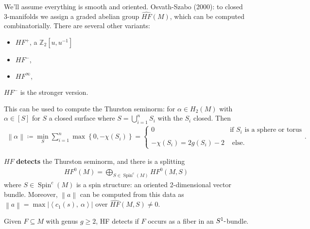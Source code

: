 We'll assume everything is smooth and oriented. Osvath-Szabo (2000): to
closed 3-manifolds we assign a graded abelian group \(\widehat{HF}(M)\),
which can be computed combinatorially. There are several other variants:

\begin{itemize}
\tightlist
\item
  \(HF^+\), a \({\mathbb{Z}}_2[u, u ^{-1} ]\)
\item
  \(HF^-\),
\item
  \(HF^\infty\),
\end{itemize}

\(HF^-\) is the stronger version.

This can be used to compute the Thurston seminorm: for
\(\alpha\in H_2(M)\) with \(\alpha\in [S]\) for \(S\) a closed surface
where \(S = \bigcup_{i=1}^n S_i\) with the \(S_i\) closed. Then
\begin{align*}
{\left\lVert { \alpha } \right\rVert} \coloneqq\min_S \sum_{i=1}^n \max\left\{{0, - \chi(S_i) }\right\} 
=
\begin{cases}
0 & \text{if } S_i \text{ is a sphere or torus} \\ 
\\
- \chi(S_i) = 2g(S_i) - 2  & \text{ else} .
\end{cases}
.\end{align*}

\begin{theorem}

\(HF\) \textbf{detects} the Thurston seminorm, and there is a splitting
\begin{align*}
HF^0(M) = \bigoplus _{S\in {\operatorname{Spin}}^c(M)} HF^0(M, S) 
\end{align*}
where \(S \in {\operatorname{Spin}}^c(M)\) is a spin structure: an
oriented 2-dimensional vector bundle. Moreover,
\({\left\lVert {a} \right\rVert}\) can be computed from this data as
\({\left\lVert {a} \right\rVert} = \max {\left\lvert { {\left\langle {c_1(s)},~{\alpha } \right\rangle} } \right\rvert}\)
over \(\widehat{HF}(M, S) \neq 0\).

\end{theorem}

\begin{theorem}[Ni]

Given \(F \subseteq M\) with genus \(g\geq 2\), HF detects if \(F\)
occurs as a fiber in an \(S^1{\hbox{-}}\)bundle.

\end{theorem}

